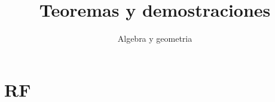 \documentclass{report}
\title{Teoremas y demostraciones}
\date{}
\author{Algebra y geometria}
\begin{document}
  \maketitle
  \listoftheorems
  \chapter*{RF}
\end{document}
